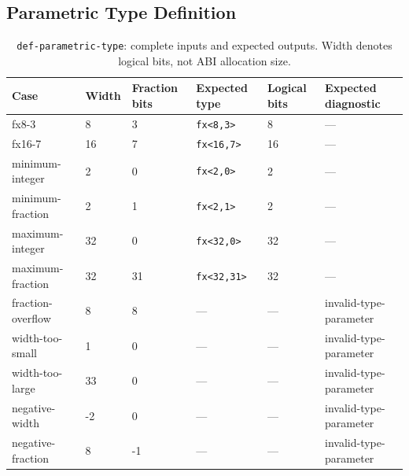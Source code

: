 \begin{longtable}{@{}p{}p{}@{}}
\end{longtable}
\endgroup

\subsection{Parametric Type Definition}
\begin{table}[H]
\caption{\texttt{def-parametric-type}: complete inputs and expected outputs.
Width denotes logical bits, not ABI allocation size.}
\label{tab:extension-type}
\centering
\scriptsize
\setlength{\tabcolsep}{3pt}
\begin{tabular*}{\textwidth}{@{\extracolsep{\fill}}llllll@{}}
\toprule
Case & Width & Fraction bits & Expected type & Logical bits & Expected diagnostic \\
\midrule
fx8-3 & 8 & 3 & \texttt{fx<8,3>} & 8 & --- \\
fx16-7 & 16 & 7 & \texttt{fx<16,7>} & 16 & --- \\
minimum-integer & 2 & 0 & \texttt{fx<2,0>} & 2 & --- \\
minimum-fraction & 2 & 1 & \texttt{fx<2,1>} & 2 & --- \\
maximum-integer & 32 & 0 & \texttt{fx<32,0>} & 32 & --- \\
maximum-fraction & 32 & 31 & \texttt{fx<32,31>} & 32 & --- \\
fraction-overflow & 8 & 8 & --- & --- & invalid-type-parameter \\
width-too-small & 1 & 0 & --- & --- & invalid-type-parameter \\
width-too-large & 33 & 0 & --- & --- & invalid-type-parameter \\
negative-width & -2 & 0 & --- & --- & invalid-type-parameter \\
negative-fraction & 8 & -1 & --- & --- & invalid-type-parameter \\
\bottomrule
\end{tabular*}
\end{table}

